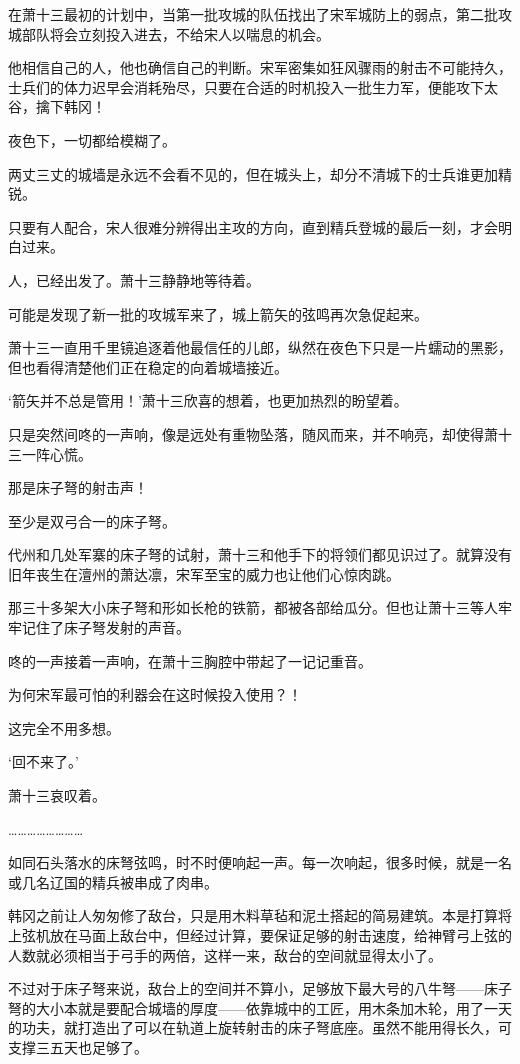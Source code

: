 在萧十三最初的计划中，当第一批攻城的队伍找出了宋军城防上的弱点，第二批攻城部队将会立刻投入进去，不给宋人以喘息的机会。

他相信自己的人，他也确信自己的判断。宋军密集如狂风骤雨的射击不可能持久，士兵们的体力迟早会消耗殆尽，只要在合适的时机投入一批生力军，便能攻下太谷，擒下韩冈！

夜色下，一切都给模糊了。

两丈三丈的城墙是永远不会看不见的，但在城头上，却分不清城下的士兵谁更加精锐。

只要有人配合，宋人很难分辨得出主攻的方向，直到精兵登城的最后一刻，才会明白过来。

人，已经出发了。萧十三静静地等待着。

可能是发现了新一批的攻城军来了，城上箭矢的弦鸣再次急促起来。

萧十三一直用千里镜追逐着他最信任的儿郎，纵然在夜色下只是一片蠕动的黑影，但也看得清楚他们正在稳定的向着城墙接近。

‘箭矢并不总是管用！’萧十三欣喜的想着，也更加热烈的盼望着。

只是突然间咚的一声响，像是远处有重物坠落，随风而来，并不响亮，却使得萧十三一阵心慌。

那是床子弩的射击声！

至少是双弓合一的床子弩。

代州和几处军寨的床子弩的试射，萧十三和他手下的将领们都见识过了。就算没有旧年丧生在澶州的萧达凛，宋军至宝的威力也让他们心惊肉跳。

那三十多架大小床子弩和形如长枪的铁箭，都被各部给瓜分。但也让萧十三等人牢牢记住了床子弩发射的声音。

咚的一声接着一声响，在萧十三胸腔中带起了一记记重音。

为何宋军最可怕的利器会在这时候投入使用？！

这完全不用多想。

‘回不来了。’

萧十三哀叹着。

……………………

如同石头落水的床弩弦鸣，时不时便响起一声。每一次响起，很多时候，就是一名或几名辽国的精兵被串成了肉串。

韩冈之前让人匆匆修了敌台，只是用木料草毡和泥土搭起的简易建筑。本是打算将上弦机放在马面上敌台中，但经过计算，要保证足够的射击速度，给神臂弓上弦的人数就必须相当于弓手的两倍，这样一来，敌台的空间就显得太小了。

不过对于床子弩来说，敌台上的空间并不算小，足够放下最大号的八牛弩——床子弩的大小本就是要配合城墙的厚度——依靠城中的工匠，用木条加木轮，用了一天的功夫，就打造出了可以在轨道上旋转射击的床子弩底座。虽然不能用得长久，可支撑三五天也足够了。

